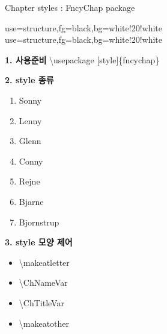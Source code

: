 \documentclass[ aspectratio=149,  14pt,blue,xcolor=pdftex,dvipsnames,table,handout,notes]{beamer}
\begin{document}
		\begin{frame}[t]{Chapter styles : FncyChap package}

			{use=structure,fg=black,bg=white!20!white}
				{use=structure,fg=black,bg=white!20!white}


		\begin{block}{\textbf{1. 사용준비}}
			\textbackslash usepackage [style]\{fncychap\}
		\end{block}


		\begin{block}{\textbf{2. style 종류}}
			\begin{enumerate}
			\item Sonny
			\item Lenny
			\item Glenn
			\item Conny
			\item Rejne
			\item Bjarne
			\item Bjornstrup
			\end{enumerate}
		\end{block}


		\begin{block}{\textbf{3. style 모양 제어}}
			\begin{itemize}
			\item \textbackslash makeatletter		   
			\item \textbackslash ChNameVar{\large\bf}
			\item \textbackslash ChTitleVar{\large\bf}
			\item \textbackslash makeatother
			\end{itemize}
		\end{block}


		\end{frame}
\end{document}
